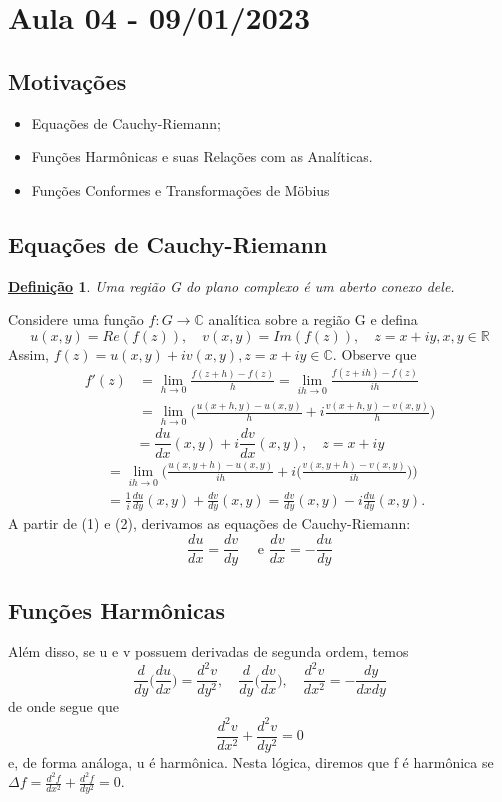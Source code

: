 \documentclass{article}
\newtheorem*{def*}{\underline{Defini\c c\~ao}}
\begin{document}
\section{Aula 04 - 09/01/2023}
\subsection{Motiva\c c\~oes}
\begin{itemize}
  \item Equa\c c\~oes de Cauchy-Riemann;
  \item Fun\c c\~oes Harm\^onicas e suas Rela\c c\~oes com as Anal\'iticas.
  \item Fun\c c\~oes Conformes e Transforma\c c\~oes de M\"{o}bius
\end{itemize}
\subsection{Equa\c c\~oes de Cauchy-Riemann}
\begin{def*}
  Uma regi\~ao G do plano complexo \'e um aberto conexo dele.
\end{def*}
  Considere uma fun\c c\~ao $f:G\rightarrow \mathbb{C}$ anal\'itica sobre a regi\~ao G e defina
  $$
  u(x, y) = Re(f(z)), \quad v(x, y) = Im(f(z)), \quad z=x+iy, x, y\in \mathbb{R}
  $$
Assim, $f(z) = u(x, y) + iv(x, y), z=x+iy\in \mathbb{C}.$ Observe que 
  \begin{align*} 
    f'(z) &= \lim _{h\to{0}}\frac{f(z+h) - f(z)}{h} = \lim _{ih\to{0}}\frac{f(z+ih) - f(z)}{ih} \\
          &= \lim _{h\to{0}}\biggl(\frac{u(x+h, y) - u(x, y)}{h} + i\frac{v(x + h, y) - v(x, y)}{h}\biggr)
  \end{align*} 
 \begin{equation}
   = \frac{du}{dx}(x, y) + i \frac{dv}{dx}(x, y), \quad z = x + iy  
 \end{equation}
\begin{align}
   &= \lim _{ih\to{0}}\biggl(\frac{u(x, y+h) - u(x, y)}{ih} + i\biggl(\frac{v(x, y+h) - v(x, y)}{ih}\biggr)\biggr) \nonumber\\
   &= \frac{1}{i}\frac{du}{dy}(x, y) + \frac{dv}{dy}(x, y) = \frac{dv}{dy}(x, y) - i \frac{du}{dy}(x, y).
\end{align}
  A partir de (1) e (2), derivamos as equa\c c\~oes de Cauchy-Riemann:
  $$
  \boxed{\frac{du}{dx}=\frac{dv}{dy} \quad \text{ e } \frac{dv}{dx} = -\frac{du}{dy}}
  $$
\subsection{Fun\c c\~oes Harm\^onicas}
  Al\'em disso, se u e v possuem derivadas de segunda ordem, temos
  $$
  \frac{d}{dy}\biggl(\frac{du}{dx}\biggr) = \frac{d^2v}{dy^2}, \quad \frac{d}{dy}\biggl(\frac{dv}{dx}\biggr), \quad \frac{d^2v}{dx^2} = -\frac{dy}{dxdy}
  $$
de onde segue que 
  $$
  \frac{d^2v}{dx^2} + \frac{d^2v}{dy^2} = 0
  $$
e, de forma an\'aloga, u \'e harm\^onica. Nesta l\'ogica, diremos que f \'e harm\^onica
se $\Delta f = \frac{d^2f}{dx^2} + \frac{d^2f}{dy^2} = 0.$
  
\end{document}
